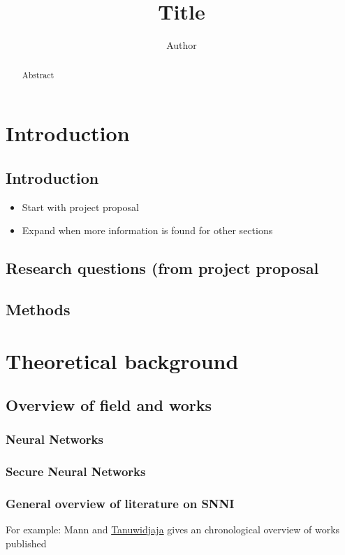 \documentclass[twoside]{Style/uva-inf-bachelor-thesis}
\title{Title}
\author{Author}
\begin{document}
\maketitle

\begin{abstract}
Abstract
\end{abstract}

\tableofcontents

\chapter{Introduction}
\section{Introduction}
\begin{itemize}
    \item Start with project proposal
    \item Expand when more information is found for other sections
\end{itemize}
\section{Research questions (from project proposal}
\section{Methods}
% 
% 

\chapter{Theoretical background}
\section{Overview of field and works}
\subsection{Neural Networks}
\subsection{Secure Neural Networks}
\subsection{General overview of literature on SNNI}
For example: Mann and
\href{https://ieeexplore.ieee.org/stamp/stamp.jsp?tp=&arnumber=9194237}{Tanuwidjaja} gives an chronological overview of works published
\end{document}
